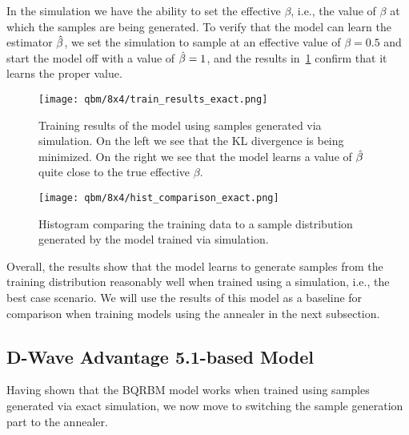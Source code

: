 In the simulation we have the ability to set the effective \( \beta \), i.e., the value of \( \beta \) at which the samples are being generated.
To verify that the model can learn the estimator \( \hat{\beta} \), we set the simulation to sample at an effective value of \( \beta = 0.5 \) and start the model off with a value of \( \hat{\beta} = 1 \), and the results in~\cref{fig:train_results_exact} confirm that it learns the proper value.

\begin{figure}[!htb]
    \begin{center}
        \texttt{[image: qbm/8x4/train\_results\_exact.png]}
    \end{center}
    \caption{Training results of the model using samples generated via simulation. On the left we see that the KL divergence is being minimized. On the right we see that the model learns a value of \( \hat{\beta} \) quite close to the true effective \( \beta \).}
    \label{fig:train_results_exact}
\end{figure}
\begin{figure}[!htb]
    \begin{center}
        \texttt{[image: qbm/8x4/hist\_comparison\_exact.png]}
    \end{center}
    \caption{Histogram comparing the training data to a sample distribution generated by the model trained via simulation.}
    \label{fig:hist_comparison_exact}
\end{figure}

Overall, the results show that the model learns to generate samples from the training distribution reasonably well when trained using a simulation, i.e., the best case scenario.
We will use the results of this model as a baseline for comparison when training models using the annealer in the next subsection.

\subsection{D-Wave Advantage 5.1-based Model}
Having shown that the BQRBM model works when trained using samples generated via exact simulation, we now move to switching the sample generation part to the annealer.

